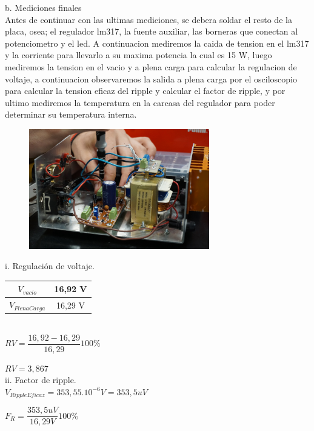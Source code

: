 b. Mediciones finales \\

Antes de continuar con las ultimas mediciones, se debera soldar el resto de la placa, osea; el regulador lm317, la fuente auxiliar, las borneras que conectan al potenciometro y el led. A continuacion mediremos la caida de tension en el lm317 y la corriente para llevarlo a su maxima potencia la cual es 15 W, luego mediremos la tension en el vacio y a plena carga para calcular la regulacion de voltaje, a continuacion observaremos la salida a plena carga por el osciloscopio para calcular la tension eficaz del ripple y calcular el factor de ripple, y por ultimo mediremos la temperatura en la carcasa del regulador para poder determinar su temperatura interna.  \\

\begin{figure}[h]
  \centering
  \includegraphics[width=0.70\textwidth]{images/placaMontada.png}
\end{figure}

i. Regulación de voltaje. \\

 \begin{tabular}{|c|c|}
  \hline
  $V_{vacio}$ & 16,92 V \\ \hline
  $V_{PlenaCarga}$ & 16,29 V \\ \hline
\end{tabular} \\

$RV = \dfrac{16,92 - 16,29}{16,29} 100\percent$

$RV = 3,867 $ \\

ii. Factor de ripple. \\

$V_{RippleEficaz} = 353,55 . 10^{-6} V = 353,5 uV $

$F_R = \dfrac{353,5 uV}{16,29 V} 100\percent $

